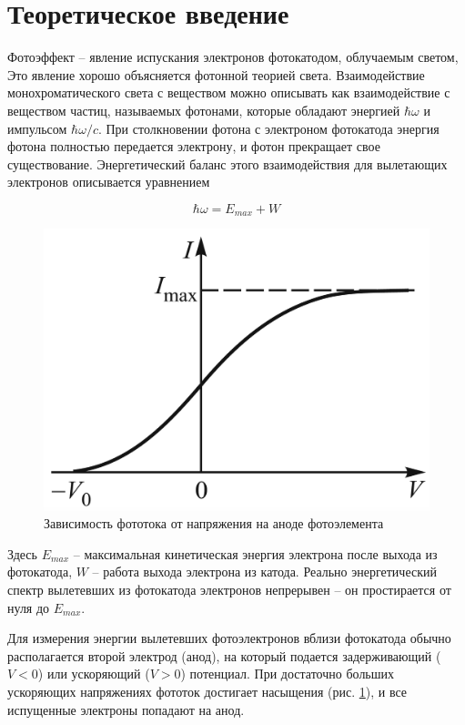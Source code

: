 \documentclass[a4paper, 12pt]{article}
\begin{document}
    \section{Теоретическое введение}
	
	Фотоэффект -- явление испускания электронов фотокатодом, облучаемым светом,  Это явление хорошо объясняется фотонной теорией света. Взаимодействие монохроматического света с веществом можно описывать как взаимодействие с веществом частиц, называемых фотонами, которые обладают энергией $\hbar \omega$ и импульсом $\hbar\omega/c$. При столкновении фотона с электроном фотокатода энергия фотона полностью передается электрону, и фотон прекращает свое существование. Энергетический баланс этого взаимодействия для вылетающих электронов описывается уравнением
	
	\begin{equation}
        \hbar \omega = E_{max} + W
        \label{eq:energy}
	\end{equation}
	
	\begin{figure}
		\includegraphics[width=\linewidth]{images/I(V).png}
		\caption{Зависимость фототока от напряжения на аноде фотоэлемента}
		\label{fig:I(V)}
	\end{figure}
	
	Здесь $E_{max}$ --  максимальная кинетическая энергия электрона после выхода из фотокатода, $W$ -- работа выхода электрона из катода. Реально энергетический спектр вылетевших из фотокатода электронов непрерывен -- он простирается от нуля до $E_{max}$. 
	
	Для измерения энергии вылетевших фотоэлектронов вблизи фотокатода обычно располагается второй электрод
	(анод), на который подается задерживающий ($V < 0$) или ускоряющий ($V > 0 $) потенциал. При достаточно больших
	ускоряющих напряжениях фототок достигает насыщения (рис. \ref{fig:I(V)}), и все испущенные электроны попадают на анод.
	
\end{document}
